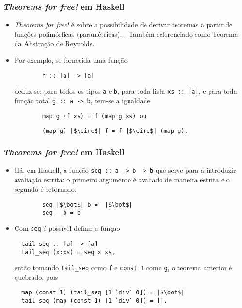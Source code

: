 \documentclass{beamer}
\begin{document}
  \begin{frame}[fragile]
    \frametitle{\textit{Theorems for free!} em Haskell}
    \begin{itemize}
      \item \textit{Theorems for free!} \'e sobre a possibilidade de derivar teoremas a partir
        de fun\c{c}\~oes polim\'orficas (param\'etricas). - Tamb\'em referenciado como Teorema
        da Abstra\c{c}\~ao de Reynolds.
        \pause
      \item Por exemplo, se fornecida uma fun\c{c}\~ao
      \begin{verbatim}
        f :: [a] -> [a]
      \end{verbatim}
    deduz-se: para todos os tipos \texttt{a} e \texttt{b}, para
      toda lista \texttt{xs :: [a]}, e para toda fun\c{c}\~ao total \texttt{g :: a -> b},
        tem-se a igualdade
      \begin{verbatim}
        map g (f xs) = f (map g xs) ou
      \end{verbatim}
      \begin{verbatim}
        (map g) |$\circ$| f = f |$\circ$| (map g).
      \end{verbatim}

    \end{itemize}
  \end{frame}

  \begin{frame}[fragile]
    \frametitle{\textit{Theorems for free!} em Haskell}
    \begin{itemize}
      \item H\'a, em Haskell, a fun\c{c}\~ao \texttt{seq :: a -> b -> b} que serve para a introduzir 
        avalia\c{c}\~ao estrita: o primeiro argumento \'e avaliado de maneira estrita e o segundo \'e retornado.
      \begin{verbatim}
        seq |$\bot$| b =  |$\bot$|
        seq _ b = b
      \end{verbatim}
      \pause
        \item
          Com \texttt{seq} \'e poss\'ivel definir a fun\c{c}\~ao 
\begin{verbatim}
  tail_seq :: [a] -> [a]
  tail_seq (x:xs) = seq x xs,
\end{verbatim}
ent\~ao tomando \texttt{tail_seq} como \texttt{f} e \texttt{const 1} como \texttt{g},
o teorema anterior \'e quebrado, pois
\begin{verbatim}
  map (const 1) (tail_seq [1 `div` 0]) = |$\bot$|
  tail_seq (map (const 1) [1 `div` 0]) = [].
\end{verbatim}
      \end{itemize}
  \end{frame}
\end{document}
